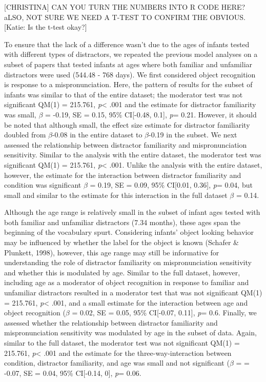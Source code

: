 \documentclass[man]{apa6}
\theoremstyle{definition}
\theoremstyle{definition}
\theoremstyle{definition}
\theoremstyle{remark}
\begin{document}
{[}CHRISTINA{]} CAN YOU TURN THE NUMBERS INTO R CODE HERE? aLSO, NOT
SURE WE NEED A T-TEST TO CONFIRM THE OBVIOUS. {[}Katie: Is the t-test
okay?{]}

To ensure that the lack of a difference wasn't due to the ages of
infants tested with different types of distractors, we repeated the
previous model analyses on a subset of papers that tested infants at
ages where both familiar and unfamiliar distractors were used (544.48 -
768 days). We first considered object recognition is response to a
mispronunciation. Here, the pattern of results for the subset of infants
was similar to that of the entire dataset; the moderator test was not
significant QM(1) = 215.761, \emph{p}\textless{} .001 and the estimate
for distractor familiarity was small, \(\beta\) = -0.19, SE = 0.15, 95\%
CI{[}-0.48, 0.1{]}, \emph{p}= 0.21. However, it should be noted that
although small, the effect size estimate for distractor familiarity
doubled from \(\beta\)-0.08 in the entire dataset to \(\beta\)-0.19 in
the subset. We next assessed the relationship between distractor
familiarity and mispronunciation sensitivity. Similar to the analysis
with the entire dataset, the moderator test was significant QM(1) =
215.761, \emph{p}\textless{} .001. Unlike the analysis with the entire
dataset, however, the estimate for the interaction between distractor
familiarity and condition was significant \(\beta\) = 0.19, SE = 0.09,
95\% CI{[}0.01, 0.36{]}, \emph{p}= 0.04, but small and similar to the
estimate for this interaction in the full dataset \(\beta\) = 0.14.

Although the age range is relatively small in the subset of infant ages
tested with both familiar and unfamiliar distractors (7.34 months),
these ages span the beginning of the vocabulary spurt. Considering
infants' object looking behavior may be influenced by whether the label
for the object is known (Schafer \& Plunkett, 1998), however, this age
range may still be informative for understanding the role of distractor
familiarity on mispronunciation sensitivity and whether this is
modulated by age. Similar to the full dataset, however, including age as
a moderator of object recognition in response to familiar and unfamiliar
distractors resulted in a moderator test that was not significant QM(1)
= 215.761, \emph{p}\textless{} .001, and a small estimate for the
interaction between age and object recognition (\(\beta\) = 0.02, SE =
0.05, 95\% CI{[}-0.07, 0.11{]}, \emph{p}= 0.6. Finally, we assessed
whether the relationship between distractor familiarity and
mispronunciation sensitivity was modulated by age in the subset of data.
Again, similar to the full dataset, the moderator test was not
significant QM(1) = 215.761, \emph{p}\textless{} .001 and the estimate
for the three-way-interaction between condition, distractor familiarity,
and age was small and not significant (\(\beta\) = = -0.07, SE = 0.04,
95\% CI{[}-0.14, 0{]}, \emph{p}= 0.06.
\end{document}
